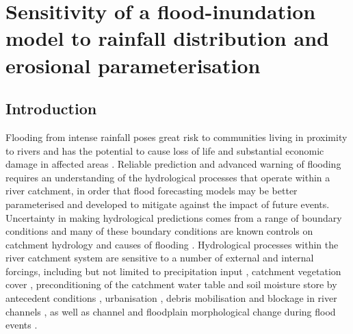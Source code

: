 \chapter{Sensitivity of a flood-inundation model to rainfall distribution and erosional parameterisation}
\label{chapter_flood_model_sensitivity}

%
%
\section{Introduction}

Flooding from intense rainfall poses great risk to communities living in proximity to rivers and has the potential to cause loss of life and substantial economic damage in affected areas \citep{pitt2008pitt}. Reliable prediction and advanced warning of flooding requires an understanding of the hydrological processes that operate within a river catchment, in order that flood forecasting models may be better parameterised and developed to mitigate against the impact of future events. Uncertainty in making hydrological predictions comes from a range of boundary conditions \citep{pappenberger2006influence} and many of these boundary conditions are known controls on catchment hydrology and causes of flooding \citep{shaw2010hydrology,sear2010guidebook}. Hydrological processes within the river catchment system are sensitive to a number of external and internal forcings, including but not limited to precipitation input \citep{nicotina2008impact}, catchment vegetation cover \citep{darby1999effect,andreassian2004waters,bradshaw2007global}, preconditioning of the catchment water table and soil moisture store by antecedent conditions \citep{berthet2009crucial}, urbanisation \citep{hollis1975effect}, debris mobilisation and blockage in river channels \citep{gippel1995environmental,jeffries2003influence}, as well as channel and floodplain morphological change during flood events \citep{werner2005spatially,wong2015sensitivity}. 


